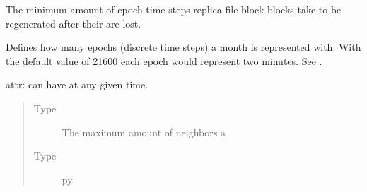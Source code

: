 \documentclass[letterpaper,10pt,english]{sphinxmanual}
\begin{document}

\begin{fulllineitems}
\label{\detokenize{app:app.environment_settings.MIN_REPLICATION_DELAY}}
The minimum amount of epoch time steps replica file block blocks take to
be regenerated after their are lost.

\end{fulllineitems}


\begin{fulllineitems}
\label{\detokenize{app:app.environment_settings.MONTH_EPOCHS}}
Defines how many epochs (discrete time steps) a month is represented with.
With the default value of 21600 each epoch would represent two minutes. See
{\hyperref[\detokenize{app:app.environment_settings.get_disk_error_chances}]{}}.

\end{fulllineitems}


\begin{fulllineitems}
\label{\detokenize{app:app.environment_settings.NEWSCAST_CACHE_SIZE}}
attr: can have at any given time.
\begin{quote}\begin{description}
\item[{Type}] \leavevmode
The maximum amount of neighbors a

\item[{Type}] \leavevmode
py

\end{description}\end{quote}

\end{fulllineitems}
\end{document}
